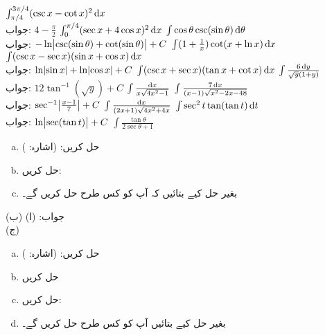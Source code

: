 $\int_{\pi/4}^{3\pi/4}(\csc x-\cot x)^2\dif x$\\
جواب:\quad
$4-\tfrac{\pi}{2}$
$\int_0^{\pi/4}(\sec x+4\cos x)^2\dif x$
$\int\cos\theta\csc(\sin\theta)\dif\theta$\\
جواب:\quad
$-\ln\abs{\csc(\sin\theta)+\cot(\sin\theta)}+C$
$\int(1+\tfrac{1}{x})\cot(x+\ln x)\dif x$
$\int(\csc x -\sec x)(\sin x+\cos x)\dif x$\\
جواب:\quad
$\ln\abs{\sin x}+\ln\abs{\cos x}+C$
$\int(\csc x+\sec x)(\tan x+\cot x)\dif x$
$\int\frac{6\dif y}{\sqrt{y}(1+y)}$\\
جواب:\quad
$12\tan^{-1}(\sqrt{y})+C$
$\int\frac{\dif x}{x\sqrt{4x^2-1}}$
$\int\frac{7\dif x}{(x-1)\sqrt{x^2-2x-48}}$\\
جواب:\quad
$\sec^{-1}\abs{\tfrac{x-1}{7}}+C$
$\int\frac{\dif x}{(2x+1)\sqrt{4x^2+4x}}$
$\int \sec^2t\tan(\tan t)\dif t$\\
جواب:\quad
$\ln\abs{\sec(\tan t)}+C$
$\int\frac{\tan \theta}{2\sec\theta+1}$
\\
\begin{enumerate}[a.]
\item
حل کریں:  (اشارہ: )
\item
حل کریں:  
\item
بغیر حل کیے بتائیں کہ آپ  کو کس طرح حل کریں گے۔
\end{enumerate}
جواب:\quad 
(ا)  (ب) \\ (ج) 
\begin{enumerate}[a.]
\item
حل کریں:  (اشارہ: ) 
\item
حل کریں 
\item
حل کریں: 
\item
بغیر حل کیے بتائیں آپ  کو کس طرح حل کریں گے۔
\end{enumerate}
